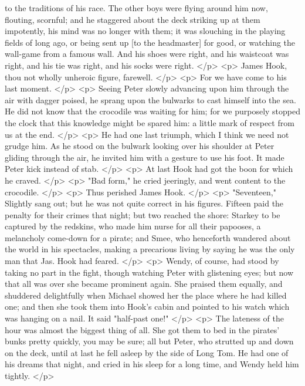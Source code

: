       to the traditions of his race. The other boys were flying around him now,
      flouting, scornful; and he staggered about the deck striking up at them
      impotently, his mind was no longer with them; it was slouching in the
      playing fields of long ago, or being sent up [to the headmaster] for good,
      or watching the wall-game from a famous wall. And his shoes were right,
      and his waistcoat was right, and his tie was right, and his socks were
      right.
    </p>
    <p>
      James Hook, thou not wholly unheroic figure, farewell.
    </p>
    <p>
      For we have come to his last moment.
    </p>
    <p>
      Seeing Peter slowly advancing upon him through the air with dagger poised,
      he sprang upon the bulwarks to cast himself into the sea. He did not know
      that the crocodile was waiting for him; for we purposely stopped the clock
      that this knowledge might be spared him: a little mark of respect from us
      at the end.
    </p>
    <p>
      He had one last triumph, which I think we need not grudge him. As he stood
      on the bulwark looking over his shoulder at Peter gliding through the air,
      he invited him with a gesture to use his foot. It made Peter kick instead
      of stab.
    </p>
    <p>
      At last Hook had got the boon for which he craved.
    </p>
    <p>
      "Bad form," he cried jeeringly, and went content to the crocodile.
    </p>
    <p>
      Thus perished James Hook.
    </p>
    <p>
      "Seventeen," Slightly sang out; but he was not quite correct in his
      figures. Fifteen paid the penalty for their crimes that night; but two
      reached the shore: Starkey to be captured by the redskins, who made him
      nurse for all their papooses, a melancholy come-down for a pirate; and
      Smee, who henceforth wandered about the world in his spectacles, making a
      precarious living by saying he was the only man that Jas. Hook had feared.
    </p>
    <p>
      Wendy, of course, had stood by taking no part in the fight, though
      watching Peter with glistening eyes; but now that all was over she became
      prominent again. She praised them equally, and shuddered delightfully when
      Michael showed her the place where he had killed one; and then she took
      them into Hook's cabin and pointed to his watch which was hanging on a
      nail. It said "half-past one!"
    </p>
    <p>
      The lateness of the hour was almost the biggest thing of all. She got them
      to bed in the pirates' bunks pretty quickly, you may be sure; all but
      Peter, who strutted up and down on the deck, until at last he fell asleep
      by the side of Long Tom. He had one of his dreams that night, and cried in
      his sleep for a long time, and Wendy held him tightly.
    </p>
